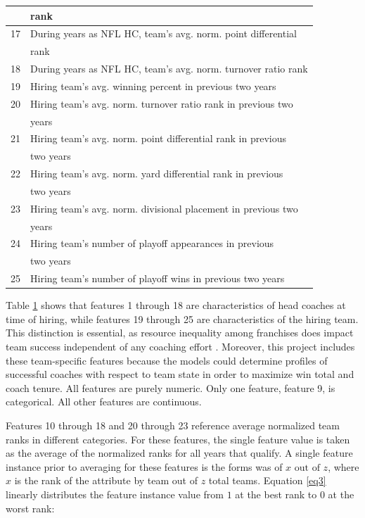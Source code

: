 \documentclass[conference]{IEEEtran}
\begin{document}
\begin{table}[htbp]
\begin{center}
\begin{tabular}{|c||l|}
&rank \\
\hline
17 & During years as NFL HC, team’s avg. norm. point differential \\
&rank \\
\hline
18 & During years as NFL HC, team’s avg. norm. turnover ratio rank \\
\hline
19 & Hiring team’s avg. winning percent in previous two years \\
\hline
20 & Hiring team’s avg. norm. turnover ratio rank in previous two \\
&years \\
\hline
21 & Hiring team’s avg. norm. point differential rank in previous\\
& two years \\
\hline
22 & Hiring team’s avg. norm. yard differential rank in previous\\
&two years \\
\hline
23 & Hiring team’s avg. norm. divisional placement in previous two\\
&years \\
\hline
24 & Hiring team’s number of playoff appearances in previous\\
&two years \\
\hline
25 & Hiring team’s number of playoff wins in previous two years \\
\hline
\end{tabular}
\label{tab1}
\end{center}
\end{table}

Table \ref{tab1} shows that features 1 through 18 are characteristics of head coaches at time of hiring, while features 19 through 25 are characteristics of the hiring team. This distinction is essential, as resource inequality among franchises does impact team success independent of any coaching effort \cite{b6}. Moreover, this project includes these team-specific features because the models could determine profiles of successful coaches with respect to team state in order to maximize win total and coach tenure. All features are purely numeric. Only one feature, feature 9, is categorical. All other features are continuous.

Features 10 through 18 and 20 through 23 reference average normalized team ranks in different categories. For these features, the single feature value is taken as the average of the normalized ranks for all years that qualify. A single feature instance prior to averaging for these features is the forms was of $x \text{ out of }z$, where $x$ is the rank of the attribute by team out of $z$ total teams. Equation \eqref{eq3} linearly distributes the feature instance value from $1$ at the best rank to $0$ at the worst rank:
\end{document}
